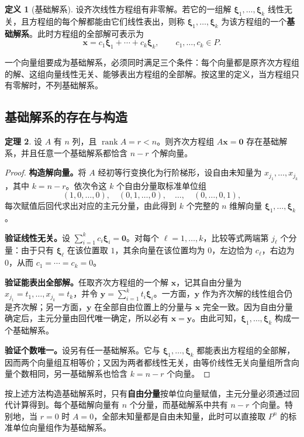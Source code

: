 \documentclass[UTF8, fontset=fandol, a4paper, 12pt]{ctexart}
\newcommand{\rank}{\operatorname{rank}}
\newcommand{\vx}{\boldsymbol{x}}
\newcommand{\vo}{\boldsymbol{0}}
\newcommand{\vxi}{\boldsymbol{\xi}}
\theoremstyle{definition}
\newtheorem{definition}{定义}[section]
\newtheorem{theorem}[definition]{定理}
\begin{document}
\begin{definition}[基础解系]
设齐次线性方程组有非零解。若它的一组解 $\vxi_1,\ldots,\vxi_k$ 线性无关，且方程组的每个解都能由它们线性表出，则称 $\vxi_1,\ldots,\vxi_k$ 为该方程组的一个\textbf{基础解系}。此时方程组的全部解可表示为
\[
 \vx=c_1\vxi_1+\cdots+c_k\vxi_k,\qquad c_1,\ldots,c_k\in P.
\]
\end{definition}

一个向量组要成为基础解系，必须同时满足三个条件：每个向量都是原齐次方程组的解、这组向量线性无关、能够表出方程组的全部解。按这里的定义，当方程组只有零解时，不列基础解系。

\subsection{基础解系的存在与构造}

\begin{theorem}
设 $A$ 有 $n$ 列，且 $\rank A=r<n$。则齐次方程组 $A\vx=\vo$ 存在基础解系，并且任意一个基础解系都恰含 $n-r$ 个解向量。
\end{theorem}
\begin{proof}
\textbf{构造解向量。}将 $A$ 经初等行变换化为行阶梯形，设自由未知量为 $x_{j_1},\ldots,x_{j_k}$，其中 $k=n-r$。依次令这 $k$ 个自由分量取标准单位组
\[
 (1,0,\ldots,0),\quad(0,1,\ldots,0),\quad\ldots,\quad(0,\ldots,0,1),
\]
每次赋值后回代求出对应的主元分量，由此得到 $k$ 个完整的 $n$ 维解向量 $\vxi_1,\ldots,\vxi_k$。

\medskip
\textbf{验证线性无关。}设 $\sum_{i=1}^k c_i\vxi_i=\vo$。对每个 $\ell=1,\ldots,k$，比较等式两端第 $j_\ell$ 个分量：由于只有 $\vxi_\ell$ 在该位置取 $1$，其余向量在该位置均为 $0$，左边恰为 $c_\ell$，右边为 $0$，从而 $c_1=\cdots=c_k=0$。

\medskip
\textbf{验证能表出全部解。}任取齐次方程组的一个解 $\vx$，记其自由分量为 $x_{j_1}=t_1,\ldots,x_{j_k}=t_k$，并令 $\boldsymbol y=\sum_{i=1}^k t_i\vxi_i$。一方面，$\boldsymbol y$ 作为齐次解的线性组合仍是齐次解；另一方面，$\boldsymbol y$ 在全部自由位置上的分量与 $\vx$ 完全一致。因为自由分量确定后，主元分量由回代唯一确定，所以必有 $\vx=\boldsymbol y$。由此可知，$\vxi_1,\ldots,\vxi_k$ 构成一个基础解系。

\medskip
\textbf{验证个数唯一。}设另有任一基础解系。它与 $\vxi_1,\ldots,\vxi_k$ 都能表出方程组的全部解，因而两个向量组互相等价；又因为两者都线性无关，由等价线性无关向量组所含向量个数相同，另一基础解系也恰含 $k=n-r$ 个向量。
\end{proof}

按上述方法构造基础解系时，只有\textbf{自由分量}按单位向量赋值，主元分量必须通过回代计算得到。每个基础解向量有 $n$ 个分量，而基础解系中共有 $n-r$ 个向量。特别地，当 $r=0$ 时 $A=0$，全部未知量都是自由未知量，此时可以直接取 $P^n$ 的标准单位向量组作为基础解系。
\end{document}
